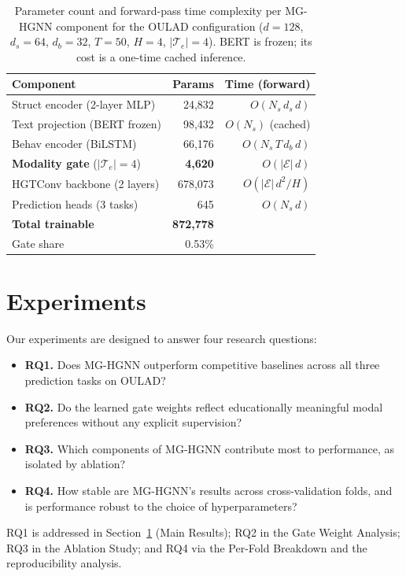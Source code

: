 \documentclass[sigconf]{acmart}
\begin{document}
\begin{table}[t]
\centering
\caption{Parameter count and forward-pass time
complexity per MG-HGNN component for the OULAD
configuration ($d{=}128$, $d_s{=}64$, $d_b{=}32$,
$T{=}50$, $H{=}4$, $|\mathcal{T}_e|{=}4$).
BERT is frozen; its cost is a one-time cached
inference.}
\label{tab:complexity}
\setlength{\tabcolsep}{5pt}
\begin{tabular}{lrr}
\toprule
\textbf{Component}
  & \textbf{Params}
  & \textbf{Time (forward)} \\
\midrule
Struct encoder (2-layer MLP) & 24{,}832
  & $O(N_s\, d_s\, d)$ \\
Text projection (BERT frozen) & 98{,}432
  & $O(N_s)$ (cached) \\
Behav encoder (BiLSTM) & 66{,}176
  & $O(N_s\, T\, d_b\, d)$ \\
\textbf{Modality gate} ($|\mathcal{T}_e|{=}4$)
  & \textbf{4{,}620}
  & $O(|\mathcal{E}|\, d)$ \\
HGTConv backbone (2 layers) & 678{,}073
  & $O(|\mathcal{E}|\, d^2/H)$ \\
Prediction heads (3 tasks) & 645
  & $O(N_s\, d)$ \\
\midrule
\textbf{Total trainable} & \textbf{872{,}778} & \\
Gate share & 0.53\% & \\
\bottomrule
\end{tabular}
\end{table}

\section{Experiments}
\label{sec:experiments}

Our experiments are designed to answer four research
questions:
\begin{itemize}
  \item \textbf{RQ1.} Does MG-HGNN outperform
    competitive baselines across all three prediction
    tasks on OULAD?
  \item \textbf{RQ2.} Do the learned gate weights
    reflect educationally meaningful modal preferences
    without any explicit supervision?
  \item \textbf{RQ3.} Which components of MG-HGNN
    contribute most to performance, as isolated by
    ablation?
  \item \textbf{RQ4.} How stable are MG-HGNN's
    results across cross-validation folds, and is
    performance robust to the choice of
    hyperparameters?
\end{itemize}
RQ1 is addressed in Section~\ref{sec:experiments}
(Main Results); RQ2 in the Gate Weight Analysis;
RQ3 in the Ablation Study; and RQ4 via the Per-Fold
Breakdown and the reproducibility analysis.
\end{document}
